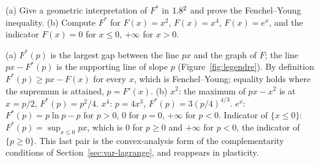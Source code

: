 \label{exo:lf}
(a) Give a geometric interpretation of $F^\ast$ in $1.8^2$ and prove the
Fenchel--Young inequality. (b) Compute $F^\ast$ for $F(x)=x^2$, $F(x)=x^4$,
$F(x)=e^x$, and the indicator $F(x)=0$ for $x\le0$, $+\infty$ for $x>0$.
\begin{solution}
(a) $F^\ast(p)$ is the largest gap between the line $px$ and the graph of
$F$; the line $px-F^\ast(p)$ is the supporting line of slope $p$
(Figure~\ref{fig:legendre}). By definition $F^\ast(p)\ge px-F(x)$ for every
$x$, which is Fenchel--Young; equality holds where the supremum is attained,
$p=F'(x)$.
(b) $x^2$: the maximum of $px-x^2$ is at $x=p/2$, $F^\ast(p)=p^2/4$.
$x^4$: $p=4x^3$, $F^\ast(p)=3(p/4)^{4/3}$.
$e^x$: $F^\ast(p)=p\ln p-p$ for $p>0$, $0$ for $p=0$, $+\infty$ for $p<0$.
Indicator of $\{x\le0\}$: $F^\ast(p)=\sup_{x\le0}px$, which is $0$ for $p\ge0$
and $+\infty$ for $p<0$, the indicator of $\{p\ge0\}$. This last pair is the
convex-analysis form of the complementarity conditions of
Section~\ref{sec:var-lagrange}, and reappears in plasticity.
\end{solution}


